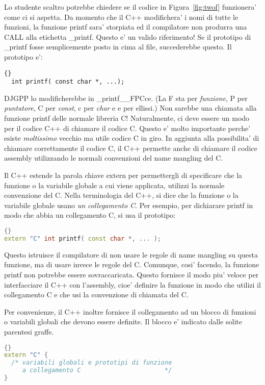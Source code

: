 Lo studente scaltro potrebbe chiedere se il codice in Figura~\ref{fig:twof}
funzionera' come ci si aspetta. Da momento che il C++ modifichera' i nomi
di tutte le funzioni, la funzione {\code printf} sara' storpiata ed il 
compilatore non produrra una {\code CALL} alla etichetta {\code \_printf}.
Questo e' un valido riferimento! Se il prototipo di {\code \_printf} fosse
semplicemente posto in cima al file, succederebbe questo. Il prototipo e': 
\begin{lstlisting}[stepnumber=0]{}
  int printf( const char *, ...);
\end{lstlisting}
\noindent DJGPP lo modificherebbe in {\code
\_printf\_\_FPCce}. (La {\code F} sta per \emph{funzione}, {\code P}
per \emph{puntatore}, {\code C} per \emph{const}, {\code c} per
\emph{char} e {\code e} per ellissi.) Non sarebbe una chiamata alla
funzione {\code printf} delle normale libreria C! Naturalmente, ci
deve essere un modo per il codice C++ di chiamare il codice C. Questo
e' molto importante perche' esiste \emph{moltissimo} vecchio ma utile
codice C in giro. In aggiunta alla possibilita' di chiamare correttamente
il codice C, il C++ permette anche di chiamare il codice assembly
utilizzando le normali convenzioni del name mangling del C.   

Il C++ estende la parola chiave {\code extern} per permettergli di 
specificare che la funzione o la variabile globale a cui viene 
applicata, utilizzi la normale convenzione del C. Nella terminologia
del C++, si dice che la funzione o la variabile globale usano \emph{un collegamento C}.
Per esempio, per dichiarare {\code printf} in modo che abbia un 
collegamento C, si usa il prototipo:
\begin{lstlisting}[language=C++,stepnumber=0]{}
extern "C" int printf( const char *, ... );
\end{lstlisting}
\noindent Questo istruisce il compilatore di non usare le regole
di name mangling su questa funzione, ma di usare invece le regole
del C. Comunque, cosi' facendo, la funzione {\code printf} non
potrebbe essere sovraccaricata. Questo fornisce il modo piu'
veloce per interfacciare il C++ con l'assembly, cioe' definire la
funzione in modo che utilizi il collegamento C e che usi la 
convenzione di chiamata del C.

Per convenienze, il C++  inoltre fornisce il collegamento ad un blocco
di funzioni o variabili globali che devono essere definite. Il blocco
e' indicato dalle solite parentesi graffe.
\begin{lstlisting}[stepnumber=0,language=C++]{}
extern "C" {
  /* variabili globali e prototipi di funzione
     a collegamento C                       */
}
\end{lstlisting}

